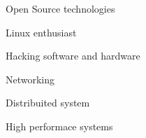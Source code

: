 

\vspace{0.5cm}

\begin{cvparagraph}
    \noindent
    \begin{minipage}{.45\textwidth}
        \begin{cvitems}
            \item {Open Source technologies}
            \item {Linux enthusiast}
            \item {Hacking software and hardware}
        \end{cvitems}
    \end{minipage}
    \hfill
    \begin{minipage}{.45\textwidth}
        \begin{cvitems}
            \item {Networking}
            \item {Distribuited system}
            \item {High performace systems}
        \end{cvitems}    
    \end{minipage}
\end{cvparagraph}
